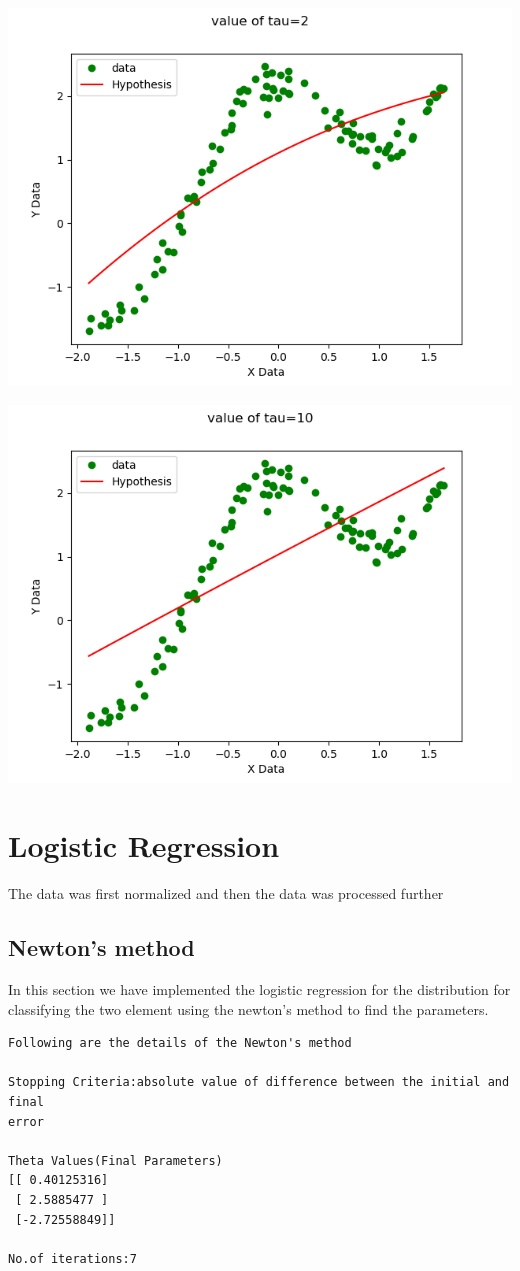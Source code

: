 \documentclass[10pt]{article}
\begin{document}
\begin{center}
\includegraphics[scale=0.8]{weightedt2.png} 
\end{center} 
\begin{center}
\includegraphics[scale=0.8]{weightedt10.png} 
\end{center}
\newpage 
\section{Logistic Regression}
The data was first normalized and then the data was processed further
\subsection{Newton's method}
In this section we have implemented the logistic regression for the distribution for classifying the two element using the newton's method to find the parameters.
\begin{lstlisting}
Following are the details of the Newton's method

Stopping Criteria:absolute value of difference between the initial and final 
error

Theta Values(Final Parameters) 
[[ 0.40125316]
 [ 2.5885477 ]
 [-2.72558849]]

No.of iterations:7
\end{lstlisting}
\end{document}
